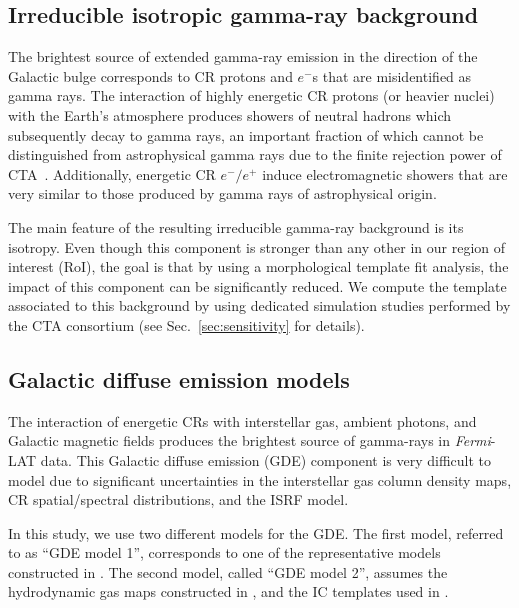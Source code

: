 \documentclass[doublespace,nopageskip]{VTthesis} %
\begin{document}
\subsection{Irreducible isotropic gamma-ray background}
The brightest source of extended gamma-ray emission in the direction of the Galactic bulge corresponds to CR protons and $e^{-}$s that are misidentified as gamma rays. The interaction of highly energetic CR protons (or heavier nuclei) with the Earth's atmosphere produces showers of neutral hadrons which subsequently decay to gamma rays, an important fraction of which cannot be distinguished from astrophysical gamma rays due to the finite rejection power of CTA~\citep{2021JCAP...01..057A,2021PhRvD.103b3011R}. Additionally, energetic CR $e^{-}/e^{+}$ induce electromagnetic showers that are very similar to those produced by gamma rays of astrophysical origin. 

The main feature of the resulting irreducible gamma-ray background is its isotropy. Even though this component is stronger than any other in our region of interest (RoI), the goal is that by using a morphological template fit analysis, the impact of this component can be significantly reduced. We compute the template associated to this background by using dedicated simulation studies performed by the CTA consortium (see Sec.~\ref{sec:sensitivity} for details). 


\subsection{Galactic diffuse emission models}
\label{subsec:GDEmodels}

The interaction of energetic CRs with interstellar gas, ambient photons, and Galactic magnetic fields produces the brightest source of gamma-rays in \textit{Fermi}-LAT data. This Galactic diffuse emission (GDE) component is very difficult to model due to significant uncertainties in the interstellar gas column density maps, CR spatial/spectral distributions, and the ISRF model.   

In this study, we use two different models for the GDE. The first model, referred to as ``GDE model 1'', corresponds to one of the representative models constructed in \cite{2018ApJ...856...45J}. The second model, called ``GDE model 2'', assumes the hydrodynamic gas maps constructed in \cite{2018NatAs...2..387M}, and the IC templates used in \cite{2020PhRvD.102d3012A}.     
\end{document}

